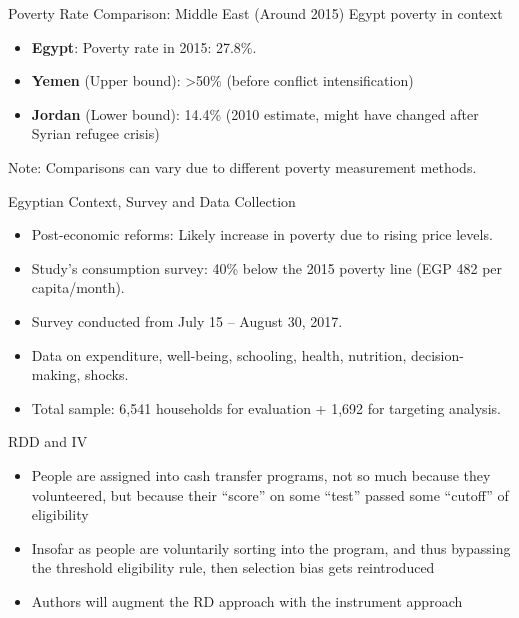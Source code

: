 \documentclass{beamer}
\begin{document}
\begin{frame}{Poverty Rate Comparison: Middle East (Around 2015)}
Egypt poverty in context

\begin{itemize}
    \item \textbf{Egypt}: Poverty rate in 2015: 27.8\%.
    \item \textbf{Yemen} (Upper bound): >50\% (before conflict intensification)
    \item \textbf{Jordan} (Lower bound): 14.4\% (2010 estimate, might have changed after Syrian refugee crisis)
\end{itemize}
\small Note: Comparisons can vary due to different poverty measurement methods.
\end{frame}





\begin{frame}{Egyptian Context, Survey and Data Collection}
\begin{itemize}
\item Post-economic reforms: Likely increase in poverty due to rising price levels.
\item Study's consumption survey: 40\% below the 2015 poverty line (EGP 482 per capita/month).
\item Survey conducted from July 15 – August 30, 2017.
\item Data on expenditure, well-being, schooling, health, nutrition, decision-making, shocks.
\item Total sample: 6,541 households for evaluation + 1,692 for targeting analysis.
\end{itemize}
\end{frame}

\begin{frame}{RDD and IV}
\begin{itemize}
\item People are assigned into cash transfer programs, not so much because they volunteered, but because their ``score'' on some ``test'' passed some ``cutoff'' of eligibility
\item Insofar as people are voluntarily sorting into the program, and thus bypassing the threshold eligibility rule, then selection bias gets reintroduced
\item Authors will augment the RD approach with the instrument approach
\end{itemize}
\end{frame}
\end{document}
